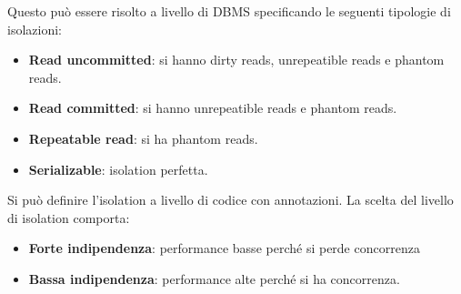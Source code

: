 Questo può essere risolto a livello di DBMS specificando le seguenti tipologie
di isolazioni:
\begin{itemize}
      \item \textbf{Read uncommitted}: si hanno dirty reads, unrepeatible reads e
            phantom reads.
      \item \textbf{Read committed}: si hanno unrepeatible reads e phantom reads.
      \item \textbf{Repeatable read}: si ha phantom reads.
      \item \textbf{Serializable}: isolation perfetta.
\end{itemize}
Si può definire l'isolation a livello di codice con annotazioni. La scelta del livello
di isolation comporta:
\begin{itemize}
      \item \textbf{Forte indipendenza}: performance basse perché si perde
            concorrenza
      \item \textbf{Bassa indipendenza}: performance alte perché si ha
            concorrenza.
\end{itemize}